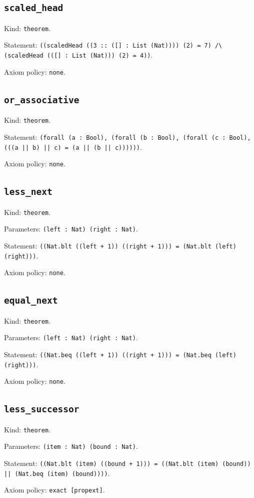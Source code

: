 \documentclass[11pt]{article}
\begin{document}
\subsection*{\texttt{scaled\_head}}
\noindent Kind: \texttt{theorem}.\par
\noindent Statement: \texttt{((scaledHead ((3 :: ([] : List (Nat)))) (2) = 7) /\textbackslash{} (scaledHead (([] : List (Nat))) (2) = 4))}.\par
\noindent Axiom policy: \texttt{none}.\par
\subsection*{\texttt{or\_associative}}
\noindent Kind: \texttt{theorem}.\par
\noindent Statement: \texttt{(forall (a : Bool), (forall (b : Bool), (forall (c : Bool), (((a || b) || c) = (a || (b || c))))))}.\par
\noindent Axiom policy: \texttt{none}.\par
\subsection*{\texttt{less\_next}}
\noindent Kind: \texttt{theorem}.\par
\noindent Parameters: \texttt{(left : Nat) (right : Nat)}.\par
\noindent Statement: \texttt{((Nat.blt ((left + 1)) ((right + 1))) = (Nat.blt (left) (right)))}.\par
\noindent Axiom policy: \texttt{none}.\par
\subsection*{\texttt{equal\_next}}
\noindent Kind: \texttt{theorem}.\par
\noindent Parameters: \texttt{(left : Nat) (right : Nat)}.\par
\noindent Statement: \texttt{((Nat.beq ((left + 1)) ((right + 1))) = (Nat.beq (left) (right)))}.\par
\noindent Axiom policy: \texttt{none}.\par
\subsection*{\texttt{less\_successor}}
\noindent Kind: \texttt{theorem}.\par
\noindent Parameters: \texttt{(item : Nat) (bound : Nat)}.\par
\noindent Statement: \texttt{((Nat.blt (item) ((bound + 1))) = ((Nat.blt (item) (bound)) || (Nat.beq (item) (bound))))}.\par
\noindent Axiom policy: \texttt{exact [propext]}.\par
\end{document}
